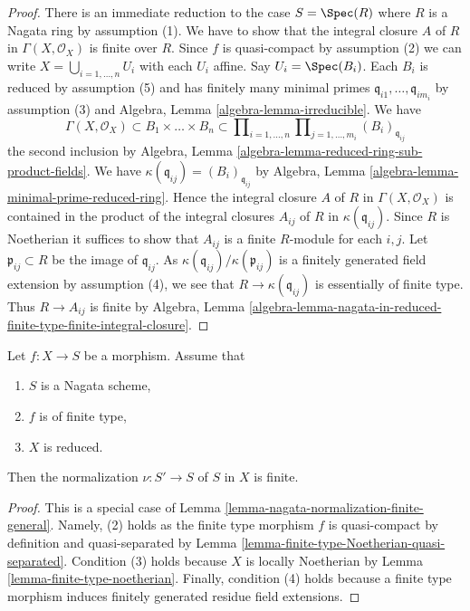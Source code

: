\begin{proof}
There is an immediate reduction to the case $S = \Spec(R)$
where $R$ is a Nagata ring by assumption (1). We have to show that
the integral closure $A$ of $R$ in $\Gamma(X, \mathcal{O}_X)$ is
finite over $R$. Since $f$ is quasi-compact by assumption (2) we can write
$X = \bigcup_{i = 1, \ldots, n} U_i$ with each $U_i$ affine.
Say $U_i = \Spec(B_i)$. Each $B_i$ is reduced by assumption (5)
and has finitely many minimal primes
$\mathfrak q_{i1}, \ldots, \mathfrak q_{im_i}$
by assumption (3) and
Algebra, Lemma \ref{algebra-lemma-irreducible}.
We have
$$
\Gamma(X, \mathcal{O}_X) \subset B_1 \times \ldots \times B_n
\subset
\prod\nolimits_{i = 1, \ldots, n}
\prod\nolimits_{j = 1, \ldots, m_i} (B_i)_{\mathfrak q_{ij}}
$$
the second inclusion by
Algebra, Lemma \ref{algebra-lemma-reduced-ring-sub-product-fields}.
We have $\kappa(\mathfrak q_{ij}) = (B_i)_{\mathfrak q_{ij}}$ by
Algebra, Lemma \ref{algebra-lemma-minimal-prime-reduced-ring}.
Hence the integral closure $A$ of $R$ in $\Gamma(X, \mathcal{O}_X)$
is contained in the product of the integral closures $A_{ij}$ of
$R$ in $\kappa(\mathfrak q_{ij})$. Since $R$ is Noetherian
it suffices to show that $A_{ij}$ is a finite $R$-module for each $i, j$.
Let $\mathfrak p_{ij} \subset R$ be the image of $\mathfrak q_{ij}$.
As $\kappa(\mathfrak q_{ij})/\kappa(\mathfrak p_{ij})$
is a finitely generated field extension by assumption (4),
we see that $R \to \kappa(\mathfrak q_{ij})$ is essentially of finite type.
Thus $R \to A_{ij}$ is finite by Algebra, Lemma
\ref{algebra-lemma-nagata-in-reduced-finite-type-finite-integral-closure}.
\end{proof}

\begin{lemma}
\label{lemma-nagata-normalization-finite}
Let $f : X \to S$ be a morphism. Assume that
\begin{enumerate}
\item $S$ is a Nagata scheme,
\item $f$ is of finite type,
\item $X$ is reduced.
\end{enumerate}
Then the normalization $\nu : S' \to S$ of $S$ in $X$ is finite.
\end{lemma}

\begin{proof}
This is a special case of
Lemma \ref{lemma-nagata-normalization-finite-general}.
Namely, (2) holds as the finite type morphism $f$ is quasi-compact
by definition and quasi-separated by
Lemma \ref{lemma-finite-type-Noetherian-quasi-separated}.
Condition (3) holds because $X$ is locally Noetherian by
Lemma \ref{lemma-finite-type-noetherian}. Finally, condition (4)
holds because a finite type morphism induces finitely generated
residue field extensions.
\end{proof}

